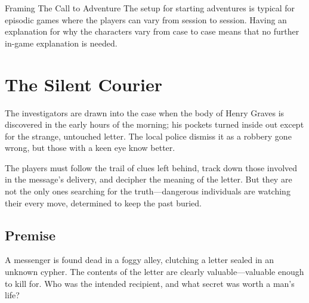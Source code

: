 \begin{WyrdComment}{Framing The Call to Adventure}
	The setup for starting adventures is typical for episodic games where the players can vary from session to session. Having an explanation for why the characters vary from case to case means that no further in-game explanation is needed.
\end{WyrdComment}



%


\newpage


\newpage
\section{The Silent Courier}

The investigators are drawn into the case when the body of Henry Graves is discovered in the early hours of the morning; his pockets turned inside out except for the strange, untouched letter. The local police dismiss it as a robbery gone wrong, but those with a keen eye know better.

The players must follow the trail of clues left behind, track down those involved in the message’s delivery, and decipher the meaning of the letter. But they are not the only ones searching for the truth—dangerous individuals are watching their every move, determined to keep the past buried.

\subsection{Premise} 
A messenger is found dead in a foggy alley, clutching a letter sealed in an unknown cypher. The contents of the letter are clearly valuable—valuable enough to kill for. Who was the intended recipient, and what secret was worth a man’s life?

